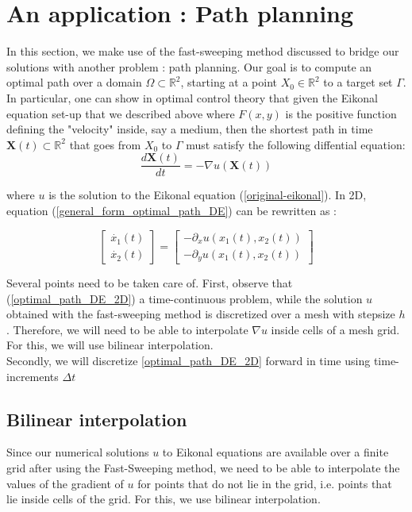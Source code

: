 \documentclass[11pt]{article}
\theoremstyle{definition}
\theoremstyle{remark}
\newcommand{\R}{\mathbb{R}}
\begin{document}
\newpage

\section{An application : Path planning}
In this section, we make use of the fast-sweeping method discussed to bridge our solutions with another problem : path planning. Our goal is to compute an optimal path over a domain $\Omega\subset\R^2$, starting at a point $X_0\in \R^2$ to a target set $\Gamma$. \\
In particular, one can show in optimal control theory that given the Eikonal equation set-up that we described above where $F(x,y)$ is the positive function defining the "velocity" inside, say a medium, then the shortest path in time $\textbf{X}(t)\subset \R^2$ that goes from $X_0$ to $\Gamma$ must satisfy the following diffential equation:
\begin{equation}
\label{general_form_optimal_path_DE}
    \frac{d\textbf{X}(t)}{dt}=-\nabla u(\textbf{X}(t))
\end{equation}

\noindent where $u$ is the solution to the Eikonal equation (\ref{original-eikonal}). In 2D, equation (\ref{general_form_optimal_path_DE}) can be rewritten as : 

\begin{equation}
\label{optimal_path_DE_2D}
    \begin{bmatrix}
        \dot{x_1}(t) \\
        \dot{x_2}(t)
    \end{bmatrix} = \begin{bmatrix}
        -\partial_xu(x_1(t),x_2(t)) \\
        -\partial_yu(x_1(t),x_2(t))
    \end{bmatrix}
\end{equation}

\noindent Several points need to be taken care of. First, observe that (\ref{optimal_path_DE_2D}) a time-continuous problem, while the solution $u$ obtained with the fast-sweeping method is discretized over a mesh with stepsize $h$. Therefore, we will need to be able to interpolate $\nabla u$ inside cells of a mesh grid. For this, we will use bilinear interpolation.
\\
Secondly, we will discretize \ref{optimal_path_DE_2D} forward in time using time-increments $\Delta t$ 

\subsection{Bilinear interpolation}
Since our numerical solutions $u$ to Eikonal equations are available over a finite grid after using the Fast-Sweeping method, we need to be able to interpolate the values of the gradient of $u$ for points that do not lie in the grid, i.e. points that lie inside cells of the grid. For this, we use bilinear interpolation.
\end{document}
